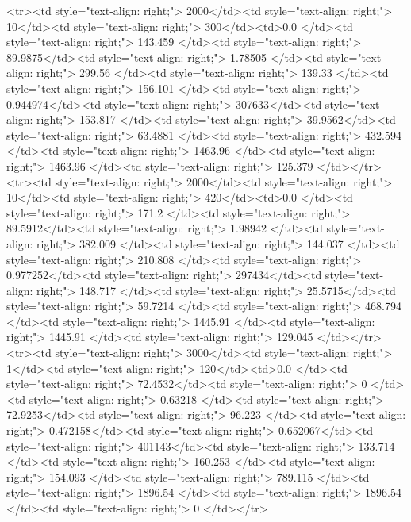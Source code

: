 <tr><td style="text-align: right;">      2000</td><td style="text-align: right;">        10</td><td style="text-align: right;">           300</td><td>0.0          </td><td style="text-align: right;">               143.459 </td><td style="text-align: right;">            89.9875</td><td style="text-align: right;">         1.78505 </td><td style="text-align: right;">        299.56  </td><td style="text-align: right;">           139.33  </td><td style="text-align: right;">             156.101   </td><td style="text-align: right;">             0.944974</td><td style="text-align: right;">              307633</td><td style="text-align: right;">                      153.817 </td><td style="text-align: right;">            39.9562</td><td style="text-align: right;">                63.4881 </td><td style="text-align: right;">       432.594 </td><td style="text-align: right;">   1463.96 </td><td style="text-align: right;">      1463.96 </td><td style="text-align: right;">                125.379 </td></tr>
<tr><td style="text-align: right;">      2000</td><td style="text-align: right;">        10</td><td style="text-align: right;">           420</td><td>0.0          </td><td style="text-align: right;">               171.2   </td><td style="text-align: right;">            89.5912</td><td style="text-align: right;">         1.98942 </td><td style="text-align: right;">        382.009 </td><td style="text-align: right;">           144.037 </td><td style="text-align: right;">             210.808   </td><td style="text-align: right;">             0.977252</td><td style="text-align: right;">              297434</td><td style="text-align: right;">                      148.717 </td><td style="text-align: right;">            25.5715</td><td style="text-align: right;">                59.7214 </td><td style="text-align: right;">       468.794 </td><td style="text-align: right;">   1445.91 </td><td style="text-align: right;">      1445.91 </td><td style="text-align: right;">                129.045 </td></tr>
<tr><td style="text-align: right;">      3000</td><td style="text-align: right;">         1</td><td style="text-align: right;">           120</td><td>0.0          </td><td style="text-align: right;">                72.4532</td><td style="text-align: right;">             0     </td><td style="text-align: right;">         0.63218 </td><td style="text-align: right;">         72.9253</td><td style="text-align: right;">            96.223 </td><td style="text-align: right;">               0.472158</td><td style="text-align: right;">             0.652067</td><td style="text-align: right;">              401143</td><td style="text-align: right;">                      133.714 </td><td style="text-align: right;">           160.253 </td><td style="text-align: right;">               154.093  </td><td style="text-align: right;">       789.115 </td><td style="text-align: right;">   1896.54 </td><td style="text-align: right;">      1896.54 </td><td style="text-align: right;">                  0     </td></tr>
